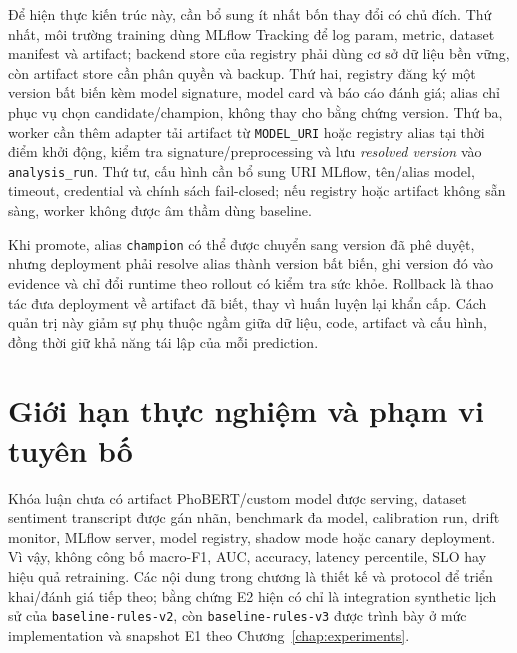 Để hiện thực kiến trúc này, cần bổ sung ít nhất bốn thay đổi có chủ đích. Thứ nhất, môi trường training dùng MLflow Tracking để log param, metric, dataset manifest và artifact; backend store của registry phải dùng cơ sở dữ liệu bền vững, còn artifact store cần phân quyền và backup. Thứ hai, registry đăng ký một version bất biến kèm model signature, model card và báo cáo đánh giá; alias chỉ phục vụ chọn candidate/champion, không thay cho bằng chứng version. Thứ ba, worker cần thêm adapter tải artifact từ \texttt{MODEL\_URI} hoặc registry alias tại thời điểm khởi động, kiểm tra signature/preprocessing và lưu \emph{resolved version} vào \texttt{analysis\_run}. Thứ tư, cấu hình cần bổ sung URI MLflow, tên/alias model, timeout, credential và chính sách fail-closed; nếu registry hoặc artifact không sẵn sàng, worker không được âm thầm dùng baseline.

Khi promote, alias \texttt{champion} có thể được chuyển sang version đã phê duyệt, nhưng deployment phải resolve alias thành version bất biến, ghi version đó vào evidence và chỉ đổi runtime theo rollout có kiểm tra sức khỏe. Rollback là thao tác đưa deployment về artifact đã biết, thay vì huấn luyện lại khẩn cấp. Cách quản trị này giảm sự phụ thuộc ngầm giữa dữ liệu, code, artifact và cấu hình, đồng thời giữ khả năng tái lập của mỗi prediction.

\section{Giới hạn thực nghiệm và phạm vi tuyên bố}
Khóa luận chưa có artifact PhoBERT/custom model được serving, dataset sentiment transcript được gán nhãn, benchmark đa model, calibration run, drift monitor, MLflow server, model registry, shadow mode hoặc canary deployment. Vì vậy, không công bố macro-F1, AUC, accuracy, latency percentile, SLO hay hiệu quả retraining. Các nội dung trong chương là thiết kế và protocol để triển khai/đánh giá tiếp theo; bằng chứng E2 hiện có chỉ là integration synthetic lịch sử của \texttt{baseline-rules-v2}, còn \texttt{baseline-rules-v3} được trình bày ở mức implementation và snapshot E1 theo Chương~\ref{chap:experiments}.
